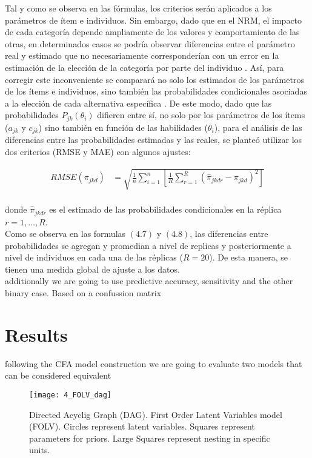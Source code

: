 Tal y como se observa en las fórmulas, los criterios serán aplicados a los parámetros de ítem e individuos. Sin embargo, dado que en el NRM, el impacto de cada categoría depende ampliamente de los valores y comportamiento de las otras, en determinados casos se podría observar diferencias entre el parámetro real y estimado que no necesariamente corresponderían con un error en la estimación de la elección de la categoría por parte del individuo \citep{Wollack2002}. Así, para corregir este inconveniente se comparará no solo los estimados de los parámetros de los ítems e individuos, sino también las probabilidades condicionales asociadas a la elección de cada alternativa específica \cite{Yen_1987, Wollack_2002}. De este modo, dado que las probabilidades $P_{jk}(\theta_{i})$ difieren entre sí, no solo por los parámetros de los ítems ($a_{jk}$ y $c_{jk}$) sino también en función de las habilidades ($\theta_i$), para el análisis de las diferencias entre las probabilidades estimadas y las reales, se planteó utilizar los dos criterios (RMSE y MAE) con algunos ajustes:

\begin{align}
	RMSE \left( \pi_{jkd} \right) &=\sqrt{ \frac{1}{n} \sum_{i=1}^{n} \left[ \frac{1}{R} \sum_{r=1}^{R} (\hat{\pi}_{jkdr} - \pi_{jkd})^2 \right]} \\
\end{align}

\noindent donde $\hat{\pi}_{jkdr}$ es el estimado de las probabilidades condicionales en la réplica $r = 1, \dots, R$.\\

\noindent Como se observa en las formulas $(4.7)$ y $(4.8)$, las diferencias entre probabilidades se agregan y promedian a nivel de replicas y posteriormente a nivel de individuos en cada una de las réplicas ($R=20$). De esta manera, se tienen una medida global de ajuste a los datos. \\


additionally we are going to use predictive accuracy, sensitivity and the other
binary case. Based on a confussion matrix 



\section{Results}

following the CFA model construction we are going to evaluate two models that can be considered equivalent 
%
\begin{figure}[h]
	\centering
	\texttt{[image: 4\_FOLV\_dag]}
	\caption[Directed Acyclig Graph (DAG). First Order Latent Variables model (FOLV).]%
	{Directed Acyclig Graph (DAG). First Order Latent Variables model (FOLV). Circles represent latent variables. Squares represent parameters for priors. Large Squares represent nesting in specific units.}
	\label{fig:FOLV_model}
\end{figure}


